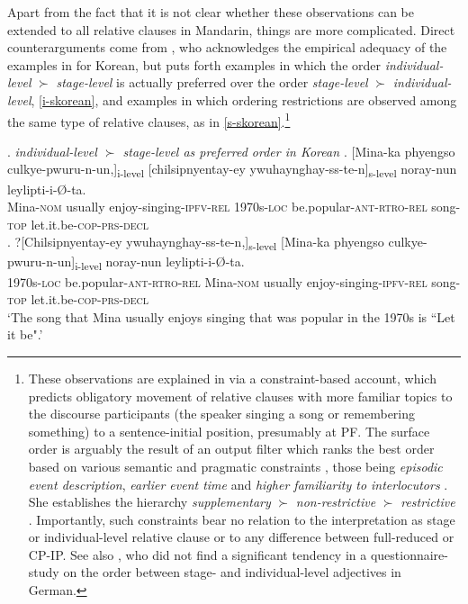Apart from the fact that it is not clear whether these observations can be extended to all relative clauses in Mandarin, things are more complicated. Direct counterarguments come from \citet{kim:2019:syntax}, who acknowledges the empirical adequacy of the examples in \citet{larson:2004:order} for  Korean, but puts forth examples in which the order \textit{individual-level} $\succ$ \textit{stage-level} is actually preferred over the order \textit{stage-level} $\succ$ \textit{individual-level}, \ref{i-skorean}, and examples in which ordering restrictions are observed among the same type of relative clauses, as in \ref{s-skorean}.\footnote{These observations are explained in \citet{kim:2019:syntax} via a constraint-based account, which predicts obligatory movement of relative clauses with more familiar topics to the discourse participants (the speaker singing a song or remembering something) to a sentence-initial position, presumably at PF. The surface order is arguably the result of an output filter \citep{prince:1993:optimality} which ranks the best order based on various semantic and pragmatic constraints \citep[§ 5]{kim:2019:syntax}, those being \textit{episodic event description}, \textit{earlier event time} and \textit{higher familiarity to interlocutors} \citep[202]{kim:2019:syntax}. She establishes the hierarchy \textit{supplementary} $\succ$ \textit{non-restrictive} $\succ$ \textit{restrictive} \citep[120]{kim:2019:syntax}. Importantly, such constraints bear no relation to the interpretation as stage or individual-level relative clause \citep[239–240]{kim:2019:syntax} or to any difference between full-reduced or CP-IP. See also \citet{kotowski:2016:adj}, who did not find a significant tendency in a questionnaire-study on the order between stage- and individual-level adjectives in German.} 

\ex. \emph{individual-level $\succ$ stage-level as preferred order in Korean \citep[85]{kim:2019:syntax}} \label{i-skorean}
\ag. [Mina-ka phyengso culkye-pwuru-n-un,]\textsubscript{i-level} [chilsipnyentay-ey ywuhaynghay-ss-te-n]\textsubscript{s-level} noray-nun leylipti-i-Ø-ta.\\
Mina-\textsc{nom} usually enjoy-singing-\textsc{ipfv-rel} 1970s-\textsc{loc} be.popular-\textsc{ant-rtro-rel} song-\textsc{top} let.it.be-\textsc{cop-prs-decl}\\
\bg. ?[Chilsipnyentay-ey ywuhaynghay-ss-te-n,]\textsubscript{s-level} [Mina-ka phyengso culkye-pwuru-n-un]\textsubscript{i-level} noray-nun leylipti-i-Ø-ta.\\
 1970s-\textsc{loc} be.popular-\textsc{ant-rtro-rel} Mina-\textsc{nom} usually enjoy-singing-\textsc{ipfv-rel} song-\textsc{top} let.it.be-\textsc{cop-prs-decl}\\
 `The song that Mina usually enjoys singing that was popular in the 1970s is ``Let it be".’

